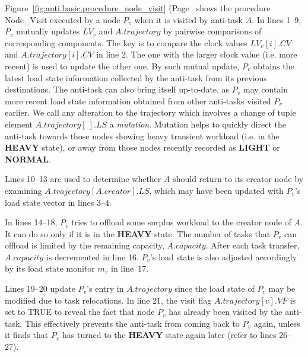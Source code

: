 Figure~\ref{fig:anti.basic.procedure_node_visit} 
(Page~\pageref{fig:anti.basic.procedure_node_visit}
shows the procedure {\sc Node\_Visit}
executed by a node $P_v$ when it is visited by anti-task $A$.
%
%
In lines 1--9, $P_v$ mutually updates
$LV_v$ and $A.trajectory$ by pairwise comparisons
of corresponding components.
%
The key is to compare the clock values
$LV_v[i].CV$ and $A.trajectory[i].CV$ in line 2.
The one with the larger clock value (i.e. more recent) is used
to update the other one.
By such mutual update, $P_v$ obtains the latest
load state information collected by the anti-task
from its previous destinations.
The anti-task can also bring itself up-to-date, as
$P_v$ may contain more recent load state information obtained
from other anti-tasks visited $P_v$ earlier.
%
%
We call any alteration to the trajectory which involves a change
of tuple element $A.trajectory[\ ].LS$ a {\it mutation\/}.
Mutation helps to quickly direct the anti-task towards those nodes showing
heavy transient workload (i.e. in the {\bf HEAVY} state),
or away from those nodes recently recorded as {\bf LIGHT} or {\bf NORMAL}.

%
%
Lines 10--13 are used to determine whether $A$ should
return to its creator node by examining
$A.trajectory[A.creator].LS$,
which may have been updated with $P_v$'s load state vector
in lines 3--4.


%
%
In lines 14--18, $P_v$ tries to offload some
surplus workload to the creator node of $A$.
It can do so only if it is in the {\bf HEAVY} state.
The number of tasks that $P_v$ can offload is limited by the
remaining capacity, $A.capacity$.
After each task transfer, $A.capacity$ is decremented in line 16.
$P_v$'s load state is also adjusted accordingly by its
load state monitor $m_v$ in line~17.


%
%
Lines 19--20 update $P_v$'s entry in $A.trajectory$
since the load state of $P_v$ may be modified due to task relocations.
In line 21, the visit flag $A.trajectory[v].VF$ is
set to TRUE to reveal the fact that node $P_v$
has already been visited by the anti-task.
This effectively prevents the anti-task from coming back to $P_v$ again,
unless it finds that $P_v$ has turned to the {\bf HEAVY} state
again later (refer to lines 26--27).


